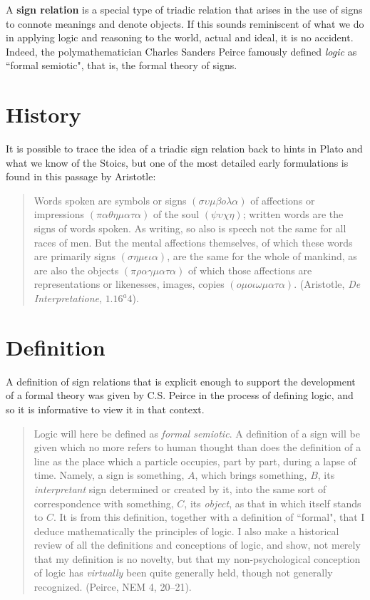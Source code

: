 \documentclass[12pt]{article}
\begin{document}
A \textbf{sign relation} is a special type of triadic relation that arises in the use of signs to connote meanings and denote objects.  If this sounds reminiscent of what we do in applying logic and reasoning to the world, actual and ideal, it is no accident.  Indeed, the polymathematician Charles Sanders Peirce famously defined \textit{logic} as ``formal semiotic", that is, the formal theory of signs.

\tableofcontents

\section{History}

It is possible to trace the idea of a triadic sign relation back to hints in Plato and what we know of the Stoics, but one of the most detailed early formulations is found in this passage by Aristotle:

\begin{quote}
Words spoken are symbols or signs $(\sigma\upsilon\mu\beta o\lambda\alpha)$ of affections or impressions $(\pi\alpha\theta\eta\mu\alpha\tau\alpha)$ of the soul $(\psi\upsilon\chi\eta)$;  written words are the signs of words spoken.  As writing, so also is speech not the same for all races of men.  But the mental affections themselves, of which these words are primarily signs $(\sigma\eta\mu\epsilon\iota\alpha)$, are the same for the whole of mankind, as are also the objects $(\pi\rho\alpha\gamma\mu\alpha\tau\alpha)$ of which those affections are representations or likenesses, images, copies $(o\mu o\iota\omega\mu\alpha\tau\alpha)$.  (Aristotle, \textit{De Interpretatione}, $1.16^{a}4$).
\end{quote}

\section{Definition}

A definition of sign relations that is explicit enough to support the development of a formal theory was given by C.S. Peirce in the process of defining logic, and so it is informative to view it in that context.

\begin{quote}
Logic will here be defined as \textit{formal semiotic}.  A definition of a sign will be given which no more refers to human thought than does the definition of a line as the place which a particle occupies, part by part, during a lapse of time.  Namely, a sign is something, $A$, which brings something, $B$, its \textit{interpretant} sign determined or created by it, into the same sort of correspondence with something, $C$, its \textit{object}, as that in which itself stands to $C$.  It is from this definition, together with a definition of ``formal", that I deduce mathematically the principles of logic.  I also make a historical review of all the definitions and conceptions of logic, and show, not merely that my definition is no novelty, but that my non-psychological conception of logic has \textit{virtually} been quite generally held, though not generally recognized.  (Peirce, NEM 4, 20--21).
\end{quote}
\end{document}
